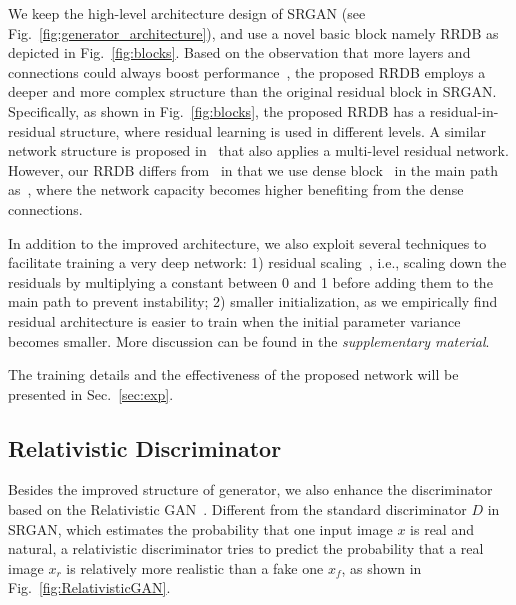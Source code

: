 \documentclass[runningheads]{llncs}
\newcommand{\needtocheck}[1]{{\color{red}{#1}}} %
\begin{document}

We keep the high-level architecture design of SRGAN (see Fig.~\ref{fig:generator_architecture}), and use a  
novel basic block namely RRDB as depicted in Fig.~\ref{fig:blocks}.
%
Based on the observation that more layers and connections could always boost 
performance~\cite{lim2017enhanced,zhang2018residual,zhang2018image}, the proposed RRDB employs a deeper and more 
complex 
structure than the original residual block in SRGAN.
%
Specifically, as shown in Fig.~\ref{fig:blocks}, the proposed RRDB has a residual-in-residual structure, where residual 
learning is used in different levels.
%
A similar network structure is proposed in~\cite{zhang2017residual} that also applies a multi-level residual network.
%
However, our RRDB differs from~\cite{zhang2017residual} in that we use dense block~\cite{huang2016densely}  
in the main path as~\cite{zhang2018residual}, where the network capacity becomes higher benefiting from the dense 
connections.

In addition to the improved architecture, we also exploit several techniques to facilitate training a very deep 
network: 1)  residual scaling~\cite{szegedy2016inception,lim2017enhanced}, i.e., scaling down the residuals by 
multiplying a constant between 0 and 1 before adding them to the main path to prevent instability; 
2) smaller initialization, as we empirically find residual architecture is easier to train when the initial parameter 
variance becomes smaller. More discussion can be found in the \textit{supplementary material}.

The training details and the effectiveness of the proposed network will be presented in Sec.~\ref{sec:exp}.


\subsection{Relativistic Discriminator}

Besides the improved structure of generator, we also enhance the discriminator based on the Relativistic 
GAN~\cite{jolicoeur2018relativistic}. 
%
Different from the standard discriminator $D$ in SRGAN, which estimates the probability that one input image $x$ is 
real and natural, a relativistic discriminator tries to predict the probability that a real image $x_r$ is relatively 
more realistic than a fake one $x_f$, as shown in Fig.~\ref{fig:RelativisticGAN}.
\end{document}
